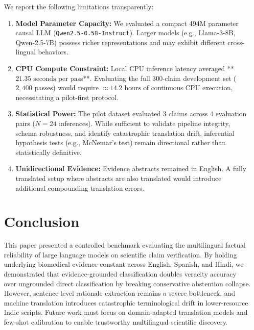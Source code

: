 \documentclass[10pt,twocolumn]{article}
\begin{document}
We report the following limitations transparently:
\begin{enumerate}
    \item \textbf{Model Parameter Capacity:} We evaluated a compact 494M parameter causal LLM (\texttt{Qwen2.5-0.5B-Instruct}). Larger models (e.g., Llama-3-8B, Qwen-2.5-7B) possess richer representations and may exhibit different cross-lingual behaviors.
    \item \textbf{CPU Compute Constraint:} Local CPU inference latency averaged **$21.35\text{ seconds}$ per pass**. Evaluating the full 300-claim development set ($2,400$ passes) would require $\approx 14.2\text{ hours}$ of continuous CPU execution, necessitating a pilot-first protocol.
    \item \textbf{Statistical Power:} The pilot dataset evaluated 3 claims across 4 evaluation pairs ($N=24$ inferences). While sufficient to validate pipeline integrity, schema robustness, and identify catastrophic translation drift, inferential hypothesis tests (e.g., McNemar's test) remain directional rather than statistically definitive.
    \item \textbf{Unidirectional Evidence:} Evidence abstracts remained in English. A fully translated setup where abstracts are also translated would introduce additional compounding translation errors.
\end{enumerate}

\section{Conclusion}
\label{sec:conclusion}

This paper presented a controlled benchmark evaluating the multilingual factual reliability of large language models on scientific claim verification. By holding underlying biomedical evidence constant across English, Spanish, and Hindi, we demonstrated that evidence-grounded classification doubles veracity accuracy over ungrounded direct classification by breaking conservative abstention collapse. However, sentence-level rationale extraction remains a severe bottleneck, and machine translation introduces catastrophic terminological drift in lower-resource Indic scripts. Future work must focus on domain-adapted translation models and few-shot calibration to enable trustworthy multilingual scientific discovery.



\end{document}
